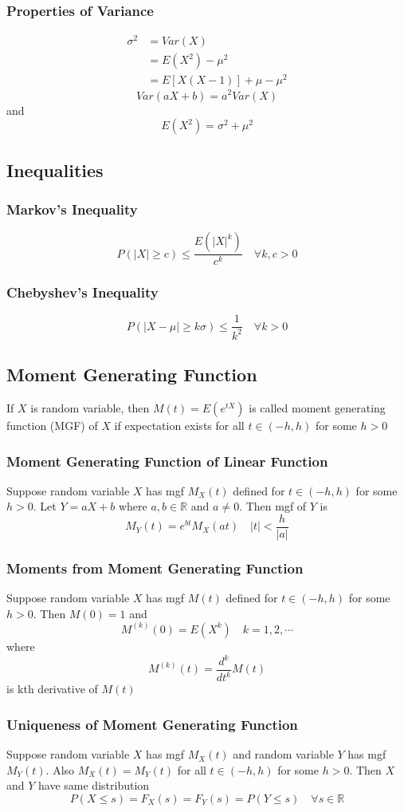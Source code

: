 \documentclass[11pt]{article}
\newcommand{\R}{{\mathbb{R}}}
\begin{document}
\subsubsection{Properties of Variance}
\begin{align*}
    \sigma^2 &= Var(X) \\
             &= E(X^2)-\mu^2 \\
             &= E[X(X-1)] + \mu - \mu^2
\end{align*}
\[Var(aX+b) = a^2Var(X)\]
and \[E(X^2) = \sigma^2+\mu^2\]
\subsection{Inequalities}
\subsubsection{Markov's Inequality}
\[P(|X|\geq c)\leq\frac{E(|X|^k)}{c^k}\quad\forall k,c>0\]
\subsubsection{Chebyshev's Inequality}
\[P(|X-\mu|\geq k\sigma)\leq\frac{1}{k^2}\quad\forall k>0\]
\subsection{Moment Generating Function}
If $X$ is random variable, then $M(t)=E(e^{tX})$ is called moment generating function (MGF) of $X$ if
expectation exists for all $t\in(-h,h)$ for some $h>0$
\subsubsection{Moment Generating Function of Linear Function}
Suppose random variable $X$ has mgf $M_X(t)$ defined for $t\in(-h,h)$ for some $h>0$.
Let $Y=aX+b$ where $a,b\in\R$ and $a\neq0$. Then mgf of $Y$ is 
\[M_Y(t)=e^{bt}M_X(at)\quad|t|<\frac{h}{|a|}\]
\subsubsection{Moments from Moment Generating Function}
Suppose random variable $X$ has mgf $M(t)$ defined for $t\in(-h,h)$ for some $h>0$. Then $M(0)=1$ and 
\[M^{(k)}(0)=E(X^k)\quad k=1,2,\cdots\]
where \[M^{(k)}(t) = \frac{d^k}{dt^k}M(t)\]
is kth derivative of $M(t)$
\subsubsection{Uniqueness of Moment Generating Function}
Suppose random variable $X$ has mgf $M_X(t)$ and random variable $Y$ has mgf $M_Y(t)$.
Also $M_X(t) = M_Y(t)$ for all $t\in(-h,h)$ for some $h>0$. Then $X$ and $Y$ have same distribution 
\[P(X\leq s)=F_X(s)=F_Y(s)=P(Y\leq s)\quad\forall s\in\R\]
\end{document}
